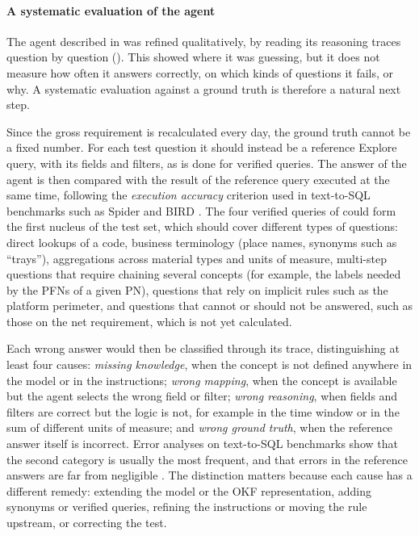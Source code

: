 \paragraph{A systematic evaluation of the agent}
The agent described in  was refined qualitatively, by reading its reasoning traces question by question (). This showed where it was guessing, but it does not measure how often it answers correctly, on which kinds of questions it fails, or why. A systematic evaluation against a ground truth is therefore a natural next step.

Since the gross requirement is recalculated every day, the ground truth cannot be a fixed number. For each test question it should instead be a reference Explore query, with its fields and filters, as is done for verified queries. The answer of the agent is then compared with the result of the reference query executed at the same time, following the \textit{execution accuracy} criterion used in text-to-SQL benchmarks such as Spider and BIRD \cite{yu2018spider, li2023bird}. The four verified queries of  could form the first nucleus of the test set, which should cover different types of questions: direct lookups of a code, business terminology (place names, synonyms such as ``trays''), aggregations across material types and units of measure, multi-step questions that require chaining several concepts (for example, the labels needed by the PFNs of a given PN), questions that rely on implicit rules such as the platform perimeter, and questions that cannot or should not be answered, such as those on the net requirement, which is not yet calculated.

Each wrong answer would then be classified through its trace, distinguishing at least four causes: \textit{missing knowledge}, when the concept is not defined anywhere in the model or in the instructions; \textit{wrong mapping}, when the concept is available but the agent selects the wrong field or filter; \textit{wrong reasoning}, when fields and filters are correct but the logic is not, for example in the time window or in the sum of different units of measure; and \textit{wrong ground truth}, when the reference answer itself is incorrect. Error analyses on text-to-SQL benchmarks show that the second category is usually the most frequent, and that errors in the reference answers are far from negligible \cite{lee2024mcssql}. The distinction matters because each cause has a different remedy: extending the model or the OKF representation, adding synonyms or verified queries, refining the instructions or moving the rule upstream, or correcting the test.

